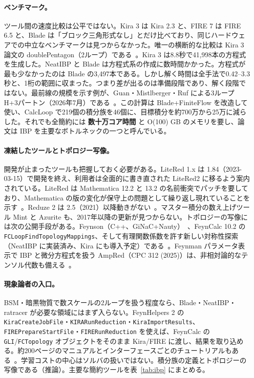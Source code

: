 \documentclass[a4paper,10pt]{ltjsarticle}
\begin{document}
\paragraph{ベンチマーク。}ツール間の速度比較は公平ではない。Kira 3 は Kira 2.3 と、FIRE 7 は FIRE 6.5 と、Blade は「ブロック三角形式なし」とだけ比べており、同じハードウェアでの中立なベンチマークは見つからなかった。唯一の横断的な比較は Kira 3 論文の doublePentagon（2ループ）である~\cite{r74}。Kira 3 は8.8秒で41,998本の方程式を生成した。NeatIBP と Blade は方程式系の作成に数時間かかった。方程式が最も少なかったのは Blade の3,497本である。しかし解く時間は全手法で0.42--3.3秒と、1桁の範囲に収まった。つまり差が出るのは準備段階であり、解く段階ではない。最前線の規模を示す例が、Guan・Mistlberger・Ruf による3ループ H+3パートン（2026年7月）である~\cite{r83}。この計算は Blade+FiniteFlow を改造して使い、CalcLoop で219個の積分族を46個に、目標積分を約700万から25万に減らした。それでも全簡約には \textbf{数十万コア時間} と O(100) GB のメモリを要し、論文は IBP を主要なボトルネックの一つと呼んでいる。

\paragraph{凍結したツールとトポロジー写像。}開発が止まったツールも把握しておく必要がある。LiteRed 1.x は 1.84（2023-03-15）で開発を終え、利用者は全面的に書き直された LiteRed2 に移るよう案内されている。LiteRed は Mathematica 12.2 と 13.2 の名前衝突でパッチを要しており、Mathematica の版の変化が保守上の問題として繰り返し現れていることを示す~\cite{r84}。Reduze 2 は 2.5（2021）以降動きがない~\cite{r85}。マスター積分の数え上げツール Mint と Azurite も、2017年以降の更新が見つからない。トポロジーの写像には次の公開手段がある。Feynson（C++、GiNaC+Nauty）~\cite{r86}、FeynCalc 10.2 の \texttt{FCLoopFindTopologyMappings}、そして有理関数係数を許す新しい対称性探索（NeatIBP に実装済み、Kira にも導入予定）である~\cite{r87}。Feynman パラメータ表示で IBP と微分方程式を扱う AmpRed（CPC 312 (2025)）は、非相対論的なテンソル代数も備える~\cite{r88}。

\paragraph{現象論者の入口。}BSM・暗黒物質で数スケールの2ループを扱う程度なら、Blade・NeatIBP・ratracer が必要な領域にはまず入らない。FeynHelpers 2 の \texttt{KiraCreateJobFile}・\texttt{KIRARunReduction}・\texttt{KiraImportResults}、\texttt{FIREPrepareStartFile}・\texttt{FIRERunReduction} を使えば、FeynCalc の \texttt{GLI}/\texttt{FCTopology} オブジェクトをそのまま Kira/FIRE に渡し、結果を取り込める。約200ページのマニュアルとインターフェースごとのチュートリアルもある~\cite{r10}。学習コストの中心はソルバの扱いではない。積分族の定義とトポロジーの写像である（推論）。主要な簡約ツールを表~\ref{tab:ibp} にまとめる。
\end{document}
